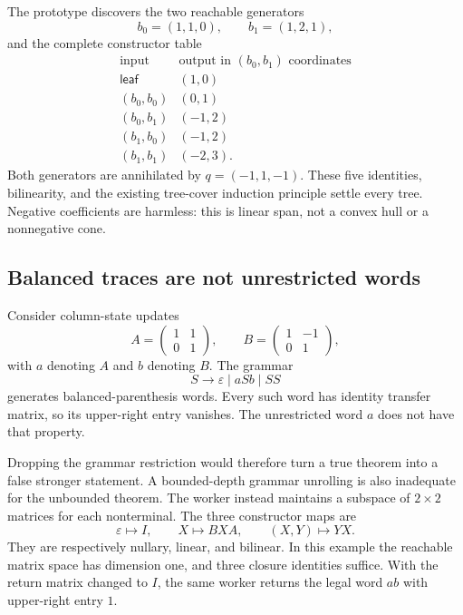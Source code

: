 \documentclass[11pt,letterpaper]{article}
\theoremstyle{definition}\newtheorem{definition}[theorem]{Definition}
\theoremstyle{remark}\newtheorem{remark}[theorem]{Remark}
\begin{document}
The prototype discovers the two reachable generators
\[
 b_0=(1,1,0),\qquad b_1=(1,2,1),
\]
and the complete constructor table
\begin{equation}\label{eq:count-table}
\begin{array}{c|c}
\text{input} & \text{output in }(b_0,b_1)\text{ coordinates}\\\hline
\mathsf{leaf} & (1,0)\\
(b_0,b_0)&(0,1)\\
(b_0,b_1)&(-1,2)\\
(b_1,b_0)&(-1,2)\\
(b_1,b_1)&(-2,3).
\end{array}
\end{equation}
Both generators are annihilated by $q=(-1,1,-1)$. These five identities, bilinearity, and the existing tree-cover induction principle settle every tree. Negative coefficients are harmless: this is linear span, not a convex hull or a nonnegative cone.

\subsection{Balanced traces are not unrestricted words}
Consider column-state updates
\[
 A=\begin{pmatrix}1&1\\0&1\end{pmatrix},\qquad
 B=\begin{pmatrix}1&-1\\0&1\end{pmatrix},
\]
with $a$ denoting $A$ and $b$ denoting $B$. The grammar
\begin{equation}\label{eq:dyck}
 S\longrightarrow\varepsilon\mid aSb\mid SS
\end{equation}
generates balanced-parenthesis words. Every such word has identity transfer matrix, so its upper-right entry vanishes. The unrestricted word $a$ does not have that property.

Dropping the grammar restriction would therefore turn a true theorem into a false stronger statement. A bounded-depth grammar unrolling is also inadequate for the unbounded theorem. The worker instead maintains a subspace of $2\times2$ matrices for each nonterminal. The three constructor maps are
\[
 \varepsilon\mapsto I,\qquad X\mapsto BXA,\qquad (X,Y)\mapsto YX.
\]
They are respectively nullary, linear, and bilinear. In this example the reachable matrix space has dimension one, and three closure identities suffice. With the return matrix changed to $I$, the same worker returns the legal word $ab$ with upper-right entry $1$.
\end{document}
